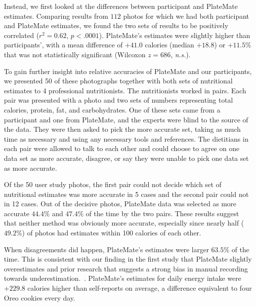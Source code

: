 Instead, we first looked at the differences between participant and PlateMate estimates.  Comparing results from $112$ photos for which we had both participant and PlateMate estimates, we found the two sets of results to be positively correlated ($r^2=0.62$, $p<.0001$). PlateMate's estimates were slightly higher than participants', with a mean difference of $+41.0$ calories (median $+18.8$) or $+11.5\%$ that was not statistically significant (Wilcoxon $z=686$, {\it n.s.}). 

To gain further insight into relative accuracies of PlateMate and our participants, we presented 50 of these photographs together with both sets of nutritional estimates to 4 professional nutritionists.  The nutritionists worked in pairs.  Each pair was presented with a photo and two sets of numbers representing total calories, protein, fat, and carbohydrates.  One of these sets came from a participant and one from PlateMate, and the experts were blind to the source of the data.  They were then asked to pick the more accurate set, taking as much time as necessary and using any necessary tools and references.  The dietitians in each pair were allowed to talk to each other and could choose to agree on one data set as more accurate, disagree, or say they were unable to pick one data set as more accurate.  


Of the 50 user study photos, the first pair could not decide which set of nutritional estimates was more accurate in 5 cases and the second pair could not in 12 cases.  Out of the decisive photos, PlateMate data was selected as more accurate $44.4\%$ and $47.4\%$ of the time by the two pairs. These results suggest that neither method was obviously more accurate, especially since nearly half ($49.2\%$) of photos had estimates within 100 calories of each other.

When disagreements did happen, PlateMate's estimates were larger $63.5\%$ of the time. This is consistent with our finding in the first study that PlateMate slightly overestimates and prior research that suggests a strong bias in manual recording towards underestimation.~\cite{pikholz2004under,goris2000undereating}.  PlateMate's estimates for daily energy intake were $+229.8$ calories higher than self-reports on average, a difference equivalent to four Oreo cookies every day.


